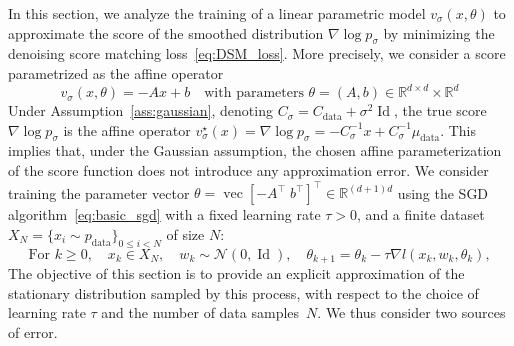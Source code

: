 \documentclass[11pt]{article}
\newcommand{\norm}[1]{\left\|{#1}\right\|}
\newcommand{\id}{\operatorname{Id}}
\newcommand{\RR}{\mathbb{R}}
\begin{document}
In this section, we analyze the training of a linear parametric model $v_{\sigma}(x, \theta)$ to approximate the score of the smoothed distribution $\nabla \log p_\sigma$ by minimizing the denoising score matching loss~\eqref{eq:DSM_loss}. More precisely, we consider a score parametrized as the affine operator 
\begin{equation*}
v_\sigma(x, \theta) = - A x + b \quad\text{with parameters } \theta = (A, b) \in \RR^{d \times d}\times \RR^d
\end{equation*}
Under Assumption~\ref{ass:gaussian}, denoting $C_\sigma = C_\mathrm{data} + \sigma^2 \id$, the true score $\nabla \log p_\sigma$ is the affine operator $ v_{\sigma}^\star(x) = \nabla \log p_\sigma = - C_\sigma^{-1} x + C_\sigma^{-1} \mu_\mathrm{data}$. This implies that, under the Gaussian assumption, the chosen affine parameterization of the score function does not introduce any approximation error.
We consider training the parameter vector \( \theta = \operatorname{vec} \left[ -A^\top \; b^\top \right]^\top \in \mathbb{R}^{(d+1)d} \) using the SGD algorithm~\eqref{eq:basic_sgd} with a fixed learning rate \( \tau > 0 \), and a finite dataset ${X_N = \{x_i \sim p_{\mathrm{data}}\}_{0 \leq i < N}}$ of size \( N \):
\begin{equation} \label{eq:score_matching_SGD}
    \text{For $k \geq 0$}, \quad  x_k \in X_N, \quad w_k \sim \mathcal{N}(0, \id), \quad \theta_{k+1} = \theta_k - \tau \nabla l(x_k, w_k, \theta_k), 
\end{equation}
The objective of this section is to provide an explicit approximation of the stationary distribution sampled by this process, with respect to the choice of learning rate $\tau$ and the number of data samples~$N$. We thus consider two sources of error.
\end{document}

